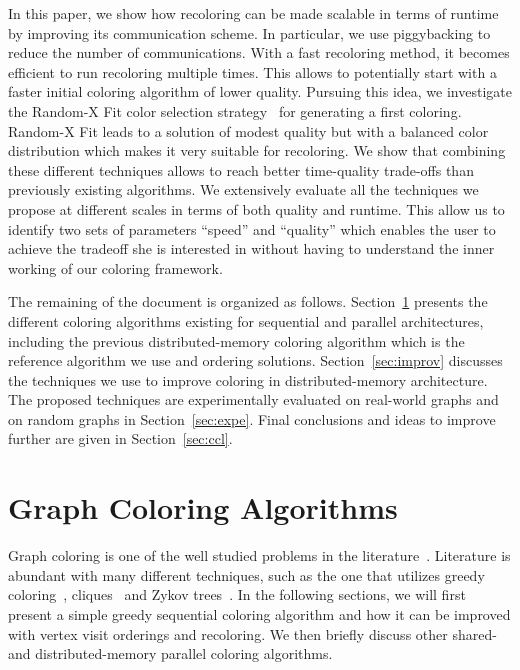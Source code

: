 \documentclass{article}
\begin{document}
In this paper, we show how recoloring can be made scalable in terms of
runtime by improving its communication scheme. In particular, we use
piggybacking to reduce the number of communications. With a fast
recoloring method, it becomes efficient to run recoloring multiple
times. This allows to potentially start with a faster initial coloring algorithm of
lower quality. Pursuing this idea, we investigate the Random-X Fit
color selection strategy~\cite{Gebremedhin02paralleldistance-k} for
generating a first coloring. Random-X Fit leads to a solution of
modest quality but with a balanced color distribution which makes it very
suitable for recoloring. We show that combining these different
techniques allows to reach better time-quality trade-offs than
previously existing algorithms. We extensively evaluate all the
techniques we propose at different scales in terms of both quality and
runtime. This allow us to identify two sets of parameters ``speed'' and ``quality''
which enables the user to achieve the tradeoff she is interested in without having
to understand the inner working of our coloring framework.

The remaining of the document is organized as
follows. Section~\ref{sec:rel_work} presents the different coloring
algorithms existing for sequential and parallel
architectures, including the previous 
distributed-memory coloring algorithm which is the reference algorithm we
use and ordering solutions. Section~\ref{sec:improv} discusses the techniques we use to improve
coloring in distributed-memory architecture. The proposed techniques
are experimentally evaluated on real-world graphs and on random graphs
in Section~\ref{sec:expe}. Final conclusions and ideas to improve further
are given in Section~\ref{sec:ccl}.

\section{Graph Coloring Algorithms}
\label{sec:rel_work}

Graph coloring is one of the well studied problems in the
literature~\cite{Ellis:1989:LVG:74142.74153,dubr81,GMP05,kosow}.
Literature is abundant with many different techniques, such as the one
that utilizes greedy coloring~\cite{matula_72, kosow},
cliques~\cite{Turner:1988:AKC:48880.48884} and Zykov
trees~\cite{dubr81}. In the following sections, we will first present
a simple greedy sequential coloring algorithm and how it can be
improved with vertex visit orderings and recoloring. We then briefly
discuss other shared- and distributed-memory parallel coloring
algorithms. 
\end{document}

